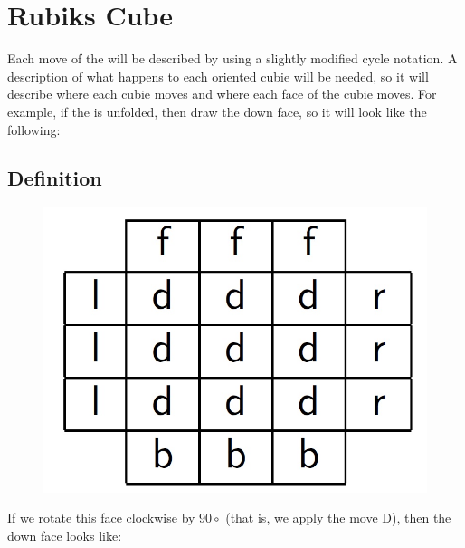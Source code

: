 \section{Rubiks Cube}

Each move of the \rubik{} will be described by using a slightly modified cycle notation. A description of what happens to each oriented cubie will be needed, so it will describe where each cubie moves and where each face of the cubie moves. For example, if the \rubik{} is unfolded, then draw the down face, so it will look like the following:

\subsection{Definition}

\begin{figure}[htbp]
	\centering
		\includegraphics{input/pics/rubiks1.jpg}
			\caption{}
	\label{fig:rubiks1}
\end{figure}

If we rotate this face clockwise by $90\circ$ (that is, we apply the move D), then the down face looks like:

